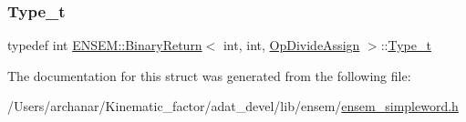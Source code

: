 \mbox{\label{structENSEM_1_1BinaryReturn_3_01int_00_01int_00_01OpDivideAssign_01_4_a1d70852aadd3281d90240a0c36417d8b}} 
\subsubsection{\texorpdfstring{Type\_t}{Type\_t}\hspace{0.1cm}{\footnotesize\ttfamily [2/2]}}
{\footnotesize\ttfamily typedef int \mbox{\hyperlink{structENSEM_1_1BinaryReturn}{E\+N\+S\+E\+M\+::\+Binary\+Return}}$<$ int, int, \mbox{\hyperlink{structENSEM_1_1OpDivideAssign}{Op\+Divide\+Assign}} $>$\+::\mbox{\hyperlink{structENSEM_1_1BinaryReturn_3_01int_00_01int_00_01OpDivideAssign_01_4_a1d70852aadd3281d90240a0c36417d8b}{Type\+\_\+t}}}



The documentation for this struct was generated from the following file\+:\begin{DoxyCompactItemize}
\item 
/\+Users/archanar/\+Kinematic\+\_\+factor/adat\+\_\+devel/lib/ensem/\mbox{\hyperlink{lib_2ensem_2ensem__simpleword_8h}{ensem\+\_\+simpleword.\+h}}\end{DoxyCompactItemize}
